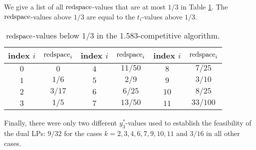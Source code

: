 We give a list of all $\mathrm{redspace}$-values that are at most $1/3$ in Table \ref{tab:sh-deltas}. The $\mathrm{redspace}$-values above $1/3$ are equal to the $t_i$-values above $1/3$.
\begin{table}
	\centering
\begin{tabular}{|c|c||c|c||c|c|}\hline
	index $i$ & $\mathrm{redspace}_i$ & index $i$ & $\mathrm{redspace}_i$ & index $i$ & $\mathrm{redspace}_i$ \\ \hline
	$0$ & $0$ & $4$ & $11 / 50$ & $8$ & $7 / 25$ \\ \hline
	$1$ & $1 / 6$ & $5$ & $2 / 9$ & $9$ & $3 / 10$ \\ \hline
	$2$ & $3 / 17$ & $6$ & $6 / 25$ & $10$ & $8 / 25$ \\ \hline
	$3$ & $1 / 5$ & $7$ & $13 / 50$ & $11$ & $33 / 100$ \\ \hline
\end{tabular}
	\caption{$\mathrm{redspace}$-values below $1/3$ in the 1.583-competitive algorithm.\label{tab:sh-deltas}}
\end{table}
Finally, there were only two different $y_3^*$-values used to establish the feasibility of the dual LPs: $9/32$ for the cases $k=2,3,4,6,7,9,10,11$ and $3/16$ in all other cases.

